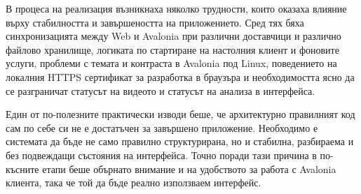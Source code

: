 В процеса на реализация възникнаха няколко трудности, които оказаха влияние върху стабилността и завършеността на приложението. Сред тях бяха синхронизацията между Web и Avalonia при различни доставчици и различно файлово хранилище, логиката по стартиране на настолния клиент и фоновите услуги, проблеми с темата и контраста в Avalonia под Linux, поведението на локалния HTTPS сертификат за разработка в браузъра и необходимостта ясно да се разграничат статусът на видеото и статусът на анализа в интерфейса.

Един от по-полезните практически изводи беше, че архитектурно правилният код сам по себе си не е достатъчен за завършено приложение. Необходимо е системата да бъде не само правилно структурирана, но и стабилна, разбираема и без подвеждащи състояния на интерфейса. Точно поради тази причина в по-късните етапи беше обърнато внимание и на удобството за работа с Avalonia клиента, така че той да бъде реално използваем интерфейс.
